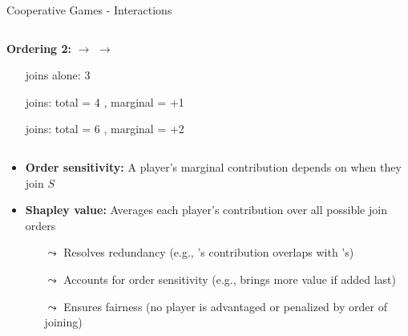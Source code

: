 \documentclass[11pt,compress,t,notes=noshow, aspectratio=169, xcolor=table]{beamer}
\begin{document}
\begin{frame}{Cooperative Games - Interactions}
\begin{columns}[T, totalwidth=\linewidth]
\begin{column}{0.5\textwidth}
\textbf{Ordering 2:}  $\rightarrow$  $\rightarrow$ 
\begin{itemize}
  \item[\colorcircle{playerblue}{white}{3}] joins alone: 3 
  \item[\colorcircle{playerred}{white}{1}] joins: total = 4 , marginal = +1
  \item[\colorcircle{playeryellow}{white}{2}] joins: total = 6 , marginal = +2
\end{itemize}
    \end{column}
\end{columns}
\pause
\begin{itemize}
  \item \textbf{Order sensitivity:} A player's marginal contribution depends on when they join $S$
  \item \textbf{Shapley value:} Averages each player’s contribution over all possible join orders
  \begin{itemize}
    \item[$\leadsto$] Resolves redundancy (e.g., ’s contribution overlaps with ’s)
    \item[$\leadsto$] Accounts for order sensitivity (e.g.,  brings more value if added last)
    \item[$\leadsto$] Ensures fairness (no player is advantaged or penalized by order of joining)%
  \end{itemize}
\end{itemize}

\end{frame}
\end{document}
